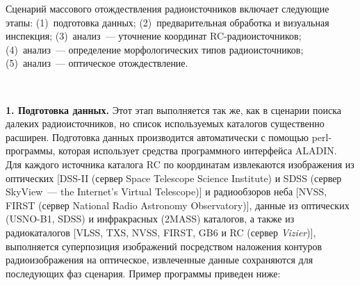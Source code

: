 \begin{multicols}{2}
      Сценарий массового отождествления радиоисточников включает следующие этапы: 
(1)~подготовка данных; (2)~предварительная обработка и визуальная инспекция; 
(3)~анализ~--- уточнение координат RC-ра\-дио\-ис\-точ\-ни\-ков; (4)~анализ~--- 
определение морфологических типов радиоисточников; (5)~анализ~--- оптическое 
отождествление. 

\begin{figure*}[b] %
\vspace*{1pt}
 \begin{center}
 \mbox{%
 \epsfxsize=162.053mm
 }
 \end{center}
 \vspace*{-9pt}
\end{figure*}
      
\textbf{1. Подготовка данных.} Этот этап выполняется так же, как в сценарии поиска 
далеких радиоисточников, но список используемых каталогов существенно расширен. 
Подготовка данных производится автоматически с помощью {perl}-программы, 
которая использует средства программного интерфейса ALADIN. Для каждого источника 
каталога RC по координатам извлекаются изображения из оптических [DSS-II (сервер 
{Space Telescope Science Institute}) и SDSS (сервер {SkyView~--- the Internet's 
Virtual Telescope})] и радиообзоров неба [NVSS, FIRST (сервер {National Radio 
Astronomy Observatory})], данные из оптических (USNO-B1, SDSS) и 
инфракрасных (2MASS) каталогов, а также из радиокаталогов [VLSS, TXS, NVSS, 
FIRST, GB6 и RC (сервер \textit{Vizier})], выполняется суперпозиция изображений 
посредством наложения контуров радиоизображения на оптическое, извлеченные данные 
сохраняются для последующих фаз сценария. Пример программы приведен ниже:



\end{multicols}

